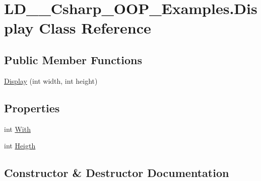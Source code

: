 \hypertarget{class_l_d__03___csharp___o_o_p___examples_1_1_display}{}\section{L\+D\+\_\+\_\+\+Csharp\+\_\+\+O\+O\+P\+\_\+\+Examples.\+Display Class Reference}
\label{class_l_d__03___csharp___o_o_p___examples_1_1_display}
\subsection*{Public Member Functions}
\begin{DoxyCompactItemize}
\item 
\mbox{\hyperlink{class_l_d__03___csharp___o_o_p___examples_1_1_display_a708bc33cb5d69b49479879c2874b2937}{Display}} (int width, int height)
\end{DoxyCompactItemize}
\subsection*{Properties}
\begin{DoxyCompactItemize}
\item 
int \mbox{\hyperlink{class_l_d__03___csharp___o_o_p___examples_1_1_display_a2bf6c49221f4a135cb99ba3af08a7777}{With}}
\item 
int \mbox{\hyperlink{class_l_d__03___csharp___o_o_p___examples_1_1_display_a298ac1d104bf6a51706ee92dec43a2f9}{Heigth}}
\end{DoxyCompactItemize}


\subsection{Constructor \& Destructor Documentation}
\mbox{\label{class_l_d__03___csharp___o_o_p___examples_1_1_display_a708bc33cb5d69b49479879c2874b2937}} 
